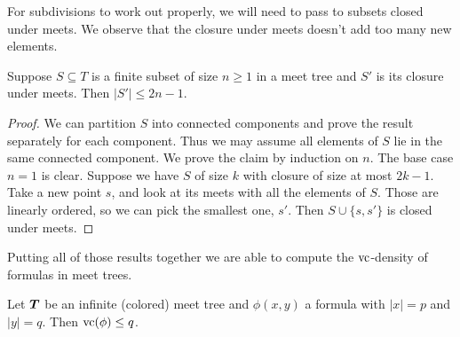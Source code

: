 For subdivisions to work out properly, we will need to pass to subsets closed under meets. We observe that the closure under meets doesn't add too many new elements.

\begin{Lemma} \label{lm_meet}
  Suppose $S \subseteq T$ is a finite subset of size $n \geq 1$ in a meet tree and $S'$ is its closure under meets. Then $|S'| \leq 2n - 1$.
\end{Lemma}
\begin{proof}
  We can partition $S$ into connected components and prove the result separately for each component. Thus we may assume all elements of $S$ lie in the same connected component. We prove the claim by induction on $n$. The base case $n = 1$ is clear. Suppose we have $S$ of size $k$ with closure of size at most $2k - 1$. Take a new point $s$, and look at its meets with all the elements of $S$.
  Those are linearly ordered, so we can pick the smallest one, $s'$.
  Then $S \cup \{s, s'\}$ is closed under meets.
\end{proof}

Putting all of those results together we are able to compute the $\operatorname{vc}$-density of formulas in meet trees.

\begin{Theorem}
  Let $\operatorname{\boldsymbol T}$ be an infinite (colored) meet tree and $\phi(x, y)$ a formula with $|x| = p$ and $|y| = q$. Then $\operatorname{vc}(\phi) \leq q$.
\end{Theorem}

